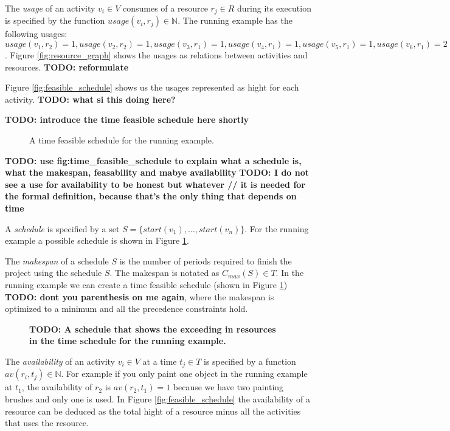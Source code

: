 \documentclass{article}
\theoremstyle{definition}
\newcommand{\inputtikz}[1]{}
\newcommand{\TODO}[1]{{\color{red}\textbf{TODO: #1}}}
\newcommand{\res}[0]{\ensuremath{R}} %
\newcommand{\av}[2]{\ensuremath{av(r_{#1}, t_{#2})}} %
\newcommand{\usage}[2]{\ensuremath{usage(v_{#1}, r_{#2})}} %
\newcommand{\start}[1]{\ensuremath{start(v_{#1})}} %
\newcommand{\makespan}[1]{\ensuremath{C_{max}(#1)}} %
\begin{document}
The \emph{usage} of an activity $v_i \in V$ consumes of a resource $r_j \in \res$ during its execution is specified by the function $\usage{i}{j} \in \mathbb{N}$.
The running example has the following usages: $\usage{1}{2} = 1, \usage{2}{2} = 1, \usage{3}{1} = 1, \usage{4}{1} = 1, \usage{5}{1} = 1, \usage{6}{1} = 2$.
Figure \ref{fig:resource_graph} shows the usages as relations between activities and resources. \TODO{reformulate}

Figure \ref{fig:feasible_schedule} shows us the usages represented as hight for each activity. \TODO{what si this doing here?}

\TODO{introduce the time feasible schedule here shortly}
\begin{figure}[h]
	\centering
	\inputtikz{time_feasible_schedule}
	\caption{A time feasible schedule for the running example. }
	\label{fig:time_feasible_schedule}
\end{figure}

\TODO{use fig:time\_feasible\_schedule to explain what a schedule is, what the makespan, feasability and mabye availability}
\TODO{I do not see a use for availability to be honest but whatever // it is needed for the formal definition, because that's the only thing that depends on time}

A \emph{schedule} is specified by a set $S = \{\start{1}, \ldots, \start{n}\}$.
For the running example a possible schedule is shown in Figure \ref{fig:time_feasible_schedule}.

The \emph{makespan} of a schedule $S$ is the number of periods required to finish the project using the schedule $S$. The makespan is notated as $\makespan{S} \in T$.
In the running example we can create a time feasible schedule (shown in Figure \ref{fig:time_feasible_schedule}) \TODO{dont you parenthesis on me again}, where the makespan is optimized to a minimum and all the precedence constraints hold. 

\begin{figure}[h]
	\centering
	\inputtikz{feasible_schedule}
	\caption{\TODO{A schedule that shows the exceeding in resources in the time schedule for the running example.} }
	\label{fig:fail_schedule}
\end{figure}

The \emph{availability} of an activity $v_i \in V$ at a time $t_j \in T$ is specified by a function $\av{i}{j} \in \mathbb{N}$.
For example if you only paint one object in the running example at $t_1$, the availability of $r_2$ is $\av{2}{1} = 1$ because we have two painting brushes and only one is used.
In Figure \ref{fig:feasible_schedule} the availability of a resource can be deduced as the total hight of a resource minus all the activities that uses the resource. 
\end{document}
